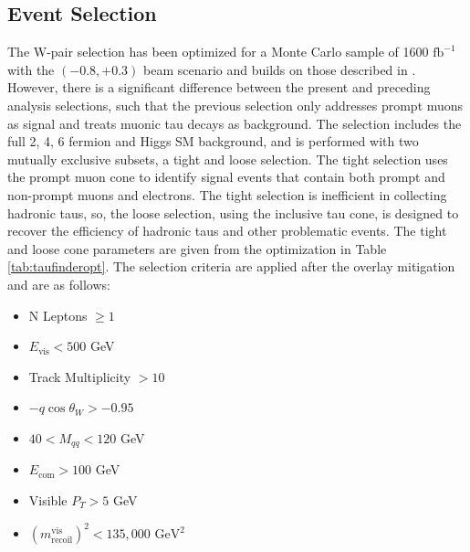 \subsection{Event Selection}
\label{subsec:EventSelection}
The W-pair selection has been optimized for a Monte Carlo sample of 1600 $\text{fb}^{-1}$ with the $(-0.8,+0.3)$ beam scenario and builds on those described in \cite{ivan}. However, there is a significant difference between the present and preceding analysis selections, such that  the previous selection only addresses prompt muons as signal and treats muonic tau decays as background. The selection includes the full 2, 4, 6 fermion and Higgs SM background, and is performed with two mutually exclusive subsets, a tight and loose selection. The tight selection uses the prompt muon cone to identify signal events that contain both prompt and non-prompt muons and electrons. The tight selection is inefficient in collecting hadronic taus, so, the loose selection, using the inclusive tau cone, is designed to recover the efficiency of hadronic taus and other problematic events. The tight and loose cone parameters are given from the optimization in Table \ref{tab:taufinderopt}. The selection criteria are applied after the overlay mitigation and are as follows:
\begin{itemize}
\item N Leptons $\geq 1$
\item $E_{\text{vis}} < 500$ GeV 
\item Track Multiplicity $> 10$ 
\item  $-q\cos\theta_W > -0.95$ 
\item $40<M_{qq}<120$ GeV
\item $E_{\text{com}} > 100$ GeV
\item Visible $P_T > 5$ GeV  
\item  $(m^{\text{vis}}_{\text{recoil}})^2 < 135,000 \, \, \text{GeV}^2$
\end{itemize}

